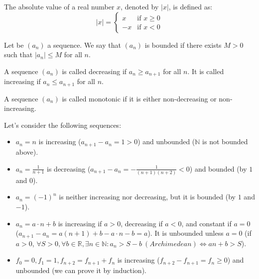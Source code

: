\begin{definition}
    The absolute value of a real number \( x \), denoted by \( |x| \), is defined as:
    \[
    |x| = 
    \begin{cases} 
    x & \text{if } x \geq 0 \\ 
    -x & \text{if } x < 0 
    \end{cases}
    \]
\end{definition}
Let be \( (a_n) \) a sequence. We say that \( (a_n) \) is bounded if there exists \( M > 0 \) such that \( |a_n| \leq M \) for all \( n \).
\begin{definition}
    A sequence \( (a_n) \) is called decreasing if \( a_n \geq a_{n+1} \) for all \( n \). It is called increasing if \( a_n \leq a_{n+1} \) for all \( n \).  
\end{definition}
\begin{definition}
    A sequence \( (a_n) \) is called monotonic if it is either non-decreasing or non-increasing.
\end{definition}

\begin{eg}
    Let's consider the following sequences:
    \begin{itemize}[itemsep=1pt,label=$\circ$]
        \item $a_n = n$ is increasing ($a_{n + 1} - a_n = 1 > 0$) and unbounded ($\mathbb{N}$ is not bounded above).
        \item $a_n = \frac{1}{n + 1}$ is decreasing ($a_{n + 1} - a_n = -\frac{1}{(n + 1)(n + 2)} < 0$) and bounded (by $1$ and $0$).
        \item $a_n = (-1)^n$ is neither increasing nor decreasing, but it is bounded (by $1$ and $-1$).
        \item $a_n = a \cdot n + b$ is increasing if \( a > 0 \), decreasing if \( a < 0 \), and constant if \( a = 0 \) ($a_{n + 1} - a_n = a(n + 1) + b - a \cdot n - b = a$). It is unbounded unless \( a = 0 \) (if $a > 0$, $\forall S > 0, \forall b \in \mathbb{R}, \exists n \in \mathbb{N}: a_n > S - b \ (Archimedean) \iff an + b > S$).
        \item $f_0 = 0, f_1 = 1, f_{n + 2} = f_{n + 1} + f_n$ is increasing ($f_{n + 2} - f_{n + 1} = f_n \geq 0$) and unbounded (we can prove it by induction).
    \end{itemize}
\end{eg}

